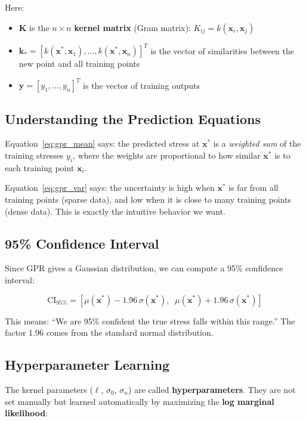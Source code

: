 \documentclass[12pt,a4paper]{report}
\begin{document}
Here:
\begin{itemize}
  \item $\mathbf{K}$ is the $n \times n$ \textbf{kernel matrix} (Gram matrix): $K_{ij} = k(\mathbf{x}_i, \mathbf{x}_j)$
  \item $\mathbf{k}_* = [k(\mathbf{x}^*, \mathbf{x}_1), \ldots, k(\mathbf{x}^*, \mathbf{x}_n)]^T$ is the vector of similarities between the new point and all training points
  \item $\mathbf{y} = [y_1, \ldots, y_n]^T$ is the vector of training outputs
\end{itemize}

\subsection{Understanding the Prediction Equations}

Equation~\eqref{eq:gpr_mean} says: the predicted stress at $\mathbf{x}^*$ is a \textit{weighted sum} of the training stresses $y_i$, where the weights are proportional to how similar $\mathbf{x}^*$ is to each training point $\mathbf{x}_i$.

Equation~\eqref{eq:gpr_var} says: the uncertainty is high when $\mathbf{x}^*$ is far from all training points (sparse data), and low when it is close to many training points (dense data). This is exactly the intuitive behavior we want.

\subsection{95\% Confidence Interval}

Since GPR gives a Gaussian distribution, we can compute a 95\% confidence interval:

\begin{equation}
\text{CI}_{95\%} = \left[\mu(\mathbf{x}^*) - 1.96\,\sigma(\mathbf{x}^*),\;\; \mu(\mathbf{x}^*) + 1.96\,\sigma(\mathbf{x}^*)\right]
\end{equation}

This means: ``We are 95\% confident the true stress falls within this range.'' The factor 1.96 comes from the standard normal distribution.

\subsection{Hyperparameter Learning}

The kernel parameters ($\ell$, $\sigma_0$, $\sigma_n$) are called \textbf{hyperparameters}. They are not set manually but learned automatically by maximizing the \textbf{log marginal likelihood}:
\end{document}
